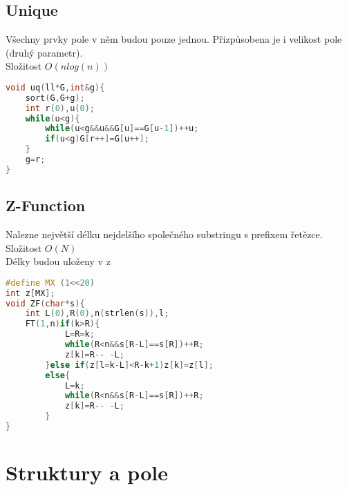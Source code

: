 \documentclass[11pt]{article}
\begin{document}
\subsection{Unique}
Všechny prvky pole v něm budou pouze jednou. Přizpůsobena je i velikost pole (druhý parametr).
\\Složitost $O(nlog(n))$
\begin{lstlisting}[language=C++]
void uq(ll*G,int&g){
    sort(G,G+g);
    int r(0),u(0);
    while(u<g){
        while(u<g&&u&&G[u]==G[u-1])++u;
        if(u<g)G[r++]=G[u++];
    }
    g=r;
}
\end{lstlisting}
\subsection{Z-Function}
Nalezne největší délku nejdelšího společného substringu s prefixem řetězce.
\\Složitost $O(N)$
\\Délky budou uloženy v \textsf{z}
\begin{lstlisting}[language=C++]
#define MX (1<<20)
int z[MX];
void ZF(char*s){
    int L(0),R(0),n(strlen(s)),l;
    FT(1,n)if(k>R){
            L=R=k;
            while(R<n&&s[R-L]==s[R])++R;
            z[k]=R-- -L;
        }else if(z[l=k-L]<R-k+1)z[k]=z[l];
        else{
            L=k;
            while(R<n&&s[R-L]==s[R])++R;
            z[k]=R-- -L;
        }
}
\end{lstlisting}
\newpage\section{Struktury a pole}
\end{document}
